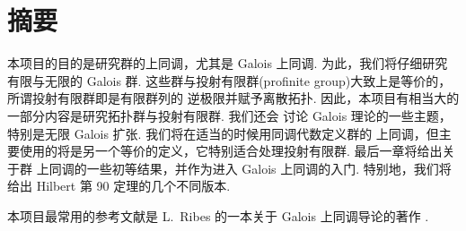 
\chapter*{摘要}

本项目的目的是研究群的上同调，尤其是 Galois 上同调. 为此，我们将仔细研究有限与无限的
Galois 群. 这些群与投射有限群(profinite group)大致上是等价的，所谓投射有限群即是有限群列的
逆极限并赋予离散拓扑. 因此，本项目有相当大的一部分内容是研究拓扑群与投射有限群. 我们还会
讨论 Galois 理论的一些主题，特别是无限 Galois 扩张. 我们将在适当的时候用同调代数定义群的
上同调，但主要使用的将是另一个等价的定义，它特别适合处理投射有限群. 最后一章将给出关于群
上同调的一些初等结果，并作为进入 Galois 上同调的入门. 特别地，我们将给出 Hilbert 第 90
定理的几个不同版本.

本项目最常用的参考文献是 L.~Ribes 的一本关于 Galois 上同调导论的著作 \cite{rib99}.

